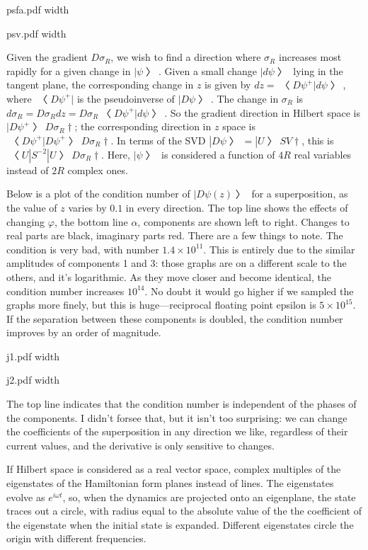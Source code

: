 \centerline{\XeTeXpicfile psfa.pdf width \hsize}

\centerline{\XeTeXpicfile psv.pdf width \hsize}

Given the gradient $Dσ_R$, we wish to find a direction where $σ_R$ increases most rapidly for a given change in $|ψ〉$.  Given a small change $|dψ〉$ lying in the tangent plane, the corresponding change in $z$ is given by $dz=〈Dψ^{+}|dψ〉$, where $〈Dψ^{+}|$ is the pseudoinverse of $|Dψ〉$.  The change in $σ_R$ is $dσ_R=Dσ_Rdz=Dσ_R〈Dψ^{+}|dψ〉$.  So the gradient direction in Hilbert space is $|Dψ^{+}〉Dσ_R†$; the corresponding direction in $z$ space is $〈Dψ^{+}|Dψ^{+}〉Dσ_R†$.  In terms of the SVD $|Dψ〉=|U〉SV†$, this is $〈U|S^{-2}|U〉Dσ_R†$.  Here, $|ψ〉$ is considered a function of $4R$ real variables instead of $2R$ complex ones.

Below is a plot of the condition number of $|Dψ(z)〉$ for a superposition, as the value of $z$ varies by $0.1$ in every direction.  The top line shows the effects of changing $φ$, the bottom line $α$, components are shown left to right.  Changes to real parts are black, imaginary parts red.  There are a few things to note.  The condition is very bad, with number $1.4×10^{11}$.  This is entirely due to the similar amplitudes of components 1 and 3: those graphs are on a different scale to the others, and it's logarithmic.  As they move closer and become identical, the condition number increases $10^{14}$.  No doubt it would go higher if we sampled the graphs more finely, but this is huge—reciprocal floating point epsilon is $5×10^{15}$.  If the separation between these components is doubled, the condition number improves by an order of magnitude.

\centerline{\XeTeXpicfile j1.pdf width \hsize}

\centerline{\XeTeXpicfile j2.pdf width \hsize}

The top line indicates that the condition number is independent of the phases of the components.  I didn't forsee that, but it isn't too surprising: we can change the coefficients of the superposition in any direction we like, regardless of their current values, and the derivative is only sensitive to changes.


If Hilbert space is considered as a real vector space, complex multiples of the eigenstates of the Hamiltonian form planes instead of lines.  The eigenstates evolve as $e^{iωt}$, so, when the dynamics are projected onto an eigenplane, the state traces out a circle, with radius equal to the absolute value of the the coefficient of the eigenstate when the initial state is expanded.  Different eigenstates circle the origin with different frequencies.

